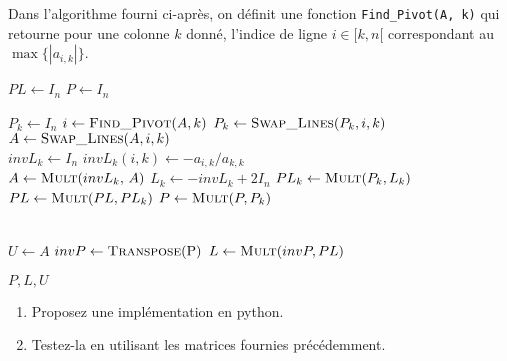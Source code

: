 \documentclass[a4paper, 10pt]{article}
\begin{document}
 
Dans l'algorithme fourni ci-après, on définit une fonction {\tt Find\_Pivot(A, k)}
qui retourne pour une colonne $k$ donné, l'indice de ligne $i \in [k, n[$  
correspondant au $\max \{|a_{i,k}|\}$.

\begin{algorithmic}[1]
   \begin{multicols}{2}
    \State $PL \gets I_n $
    \State $P \gets I_n $
    
    \For{$k \in [0, n-1[$}
        \State $P_k \gets I_n $
        \State $i \gets \Call{Find\_Pivot}{$$A, k$$} $
        \State $P_k \gets \Call{Swap\_Lines}{$$P_k,i, k$$} $
        \State $A \gets \Call{Swap\_Lines}{$$A,i, k$$} $ \\
        \State $invL_k \gets I_n$ 
            \For{$i \in [k+1, n-1[$}
                    \State $invL_k(i,k) \gets -a_{i,k}/a_{k,k} $
            \EndFor \\
        \State $A \gets \Call{Mult}{$$invL_k$, $A$$} $   
        \State $L_k \gets -invL_k + 2 I_n $
        \State $PL_k \gets  \Call{Mult}{$$P_k, L_k$$} $
        \State $PL \gets \Call{Mult}{$$PL, PL_k$$} $    
        \State $P \gets \Call{Mult}{$$P, P_k$$} $ 
                 
      \EndFor\\

      \State $U \gets A $
      \State $invP \gets \Call{Transpose}{$P$} $
      \State $L \gets \Call{Mult}{$$invP, PL$$} $ 
                                
    \State \Return $P, L, U$

\EndFunction
\end{multicols}
\end{algorithmic}

  \begin{enumerate} 
 \item Proposez une implémentation en python.
 \item Testez-la en utilisant les matrices fournies précédemment.
  \end{enumerate} 
 
\end{document}

